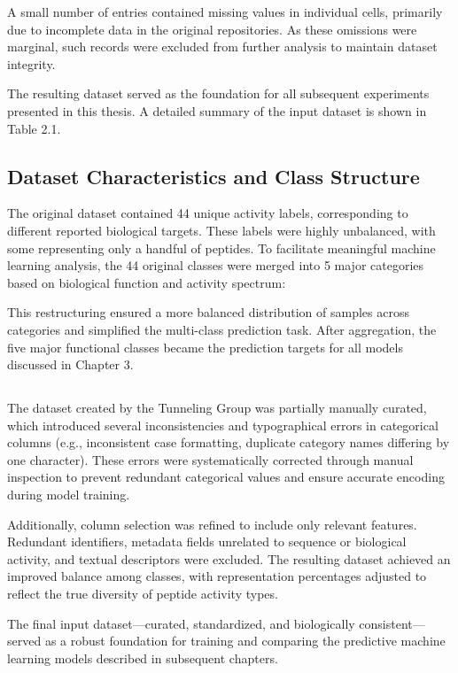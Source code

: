 \documentclass[a4paper,twoside,12pt]{book}
\begin{document}
A small number of entries contained missing values in individual cells, primarily due to incomplete data in the original repositories. 
As these omissions were marginal, such records were excluded from further analysis to maintain dataset integrity.

The resulting dataset served as the foundation for all subsequent experiments presented in this thesis. 
A detailed summary of the input dataset is shown in Table 2.1.

\subsection{Dataset Characteristics and Class Structure}
The original dataset contained 44 unique activity labels, corresponding to different reported biological targets. 
These labels were highly unbalanced, with some representing only a handful of peptides. 
To facilitate meaningful machine learning analysis, the 44 original classes were merged into 5 major categories based on biological function and activity spectrum:



This restructuring ensured a more balanced distribution of samples across categories and simplified the multi-class prediction task.
After aggregation, the five major functional classes became the prediction targets for all models discussed in Chapter 3.

\subsection{}
The dataset created by the Tunneling Group was partially manually curated, 
which introduced several inconsistencies and typographical errors in categorical columns (e.g., inconsistent case formatting, duplicate category names differing by one character).
These errors were systematically corrected through manual inspection to prevent redundant categorical values and ensure accurate encoding during model training.

Additionally, column selection was refined to include only relevant features. Redundant identifiers, metadata fields unrelated to sequence or biological activity, and textual descriptors were excluded. 
The resulting dataset achieved an improved balance among classes, with representation percentages adjusted to reflect the true diversity of peptide activity types.

The final input dataset—curated, standardized, and biologically consistent—served as a robust foundation for training and comparing the predictive machine learning models described in subsequent chapters.
\end{document}

